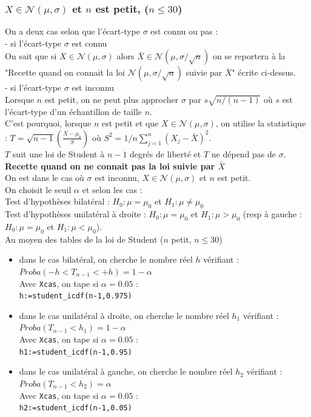 \documentclass[a4paper,11pt]{book}
\begin{document}
\subsubsection{$X \in \mathcal N(\mu,\sigma)$ et $n$ est petit,  ($n\leq30$)}
On a deux cas selon que l'\'ecart-type $\sigma$ est connu ou pas : \\
- si l'\'ecart-type $\sigma$ est connu\\
On sait que si $X \in \mathcal N(\mu,\sigma)$ alors 
$\bar X\in \mathcal N(\mu,\sigma/\sqrt n)$  on se reportera \`a la "Recette 
quand on connait la loi $\mathcal N(\mu,\sigma/\sqrt n)$ suivie par $\bar X$"
 \'ecrite ci-dessus.\\
- si l'\'ecart-type $\sigma$ est inconnu\\
Lorsque $n$ est petit, on ne peut plus approcher $\sigma$ par $s\sqrt{n/(n-1)}$
 o\`u $s$ est l'\'ecart-type  d'un \'echantillon de taille $n$.\\ 
C'est pourquoi, lorsque $n$ est petit et que $X \in \mathcal N(\mu,\sigma)$, on
utilise la statistique :
$T=\sqrt{n-1}(\frac{\bar X-\mu_0}{S})$ o\`u 
$S^2=1/n \sum_{j=1}^n(X_j-\bar X)^2$.\\
$T$ suit une loi de Student \`a $n-1$ degr\'es de libert\'e et $T$ ne d\'epend 
pas de $\sigma$. \\
{\bf Recette quand on ne connait pas la loi suivie par $\bar X$}\\ 
On est dans le cas o\`u 
$\sigma $ est inconnu, $X \in \mathcal N(\mu,\sigma)$ et $n$ est petit.\\
On choisit le seuil $\alpha$ et selon les cas :\\
Test d'hypoth\`eses bilat\'eral : $H_0 :\mu =\mu_0$ et  $H_1 : \mu\neq \mu_0$\\
Test d'hypoth\`eses unilat\'eral \`a droite : $H_0 :\mu =\mu_0$ et  
$H_1:\mu> \mu_0$ (resp \`a gauche : $H_0 :\mu =\mu_0$ et  $H_1:\mu< \mu_0$).\\
Au moyen des tables de la loi de
Student ($n$ petit, $n \leq 30$)  
\begin{itemize}
\item dans le cas bilat\'eral, on cherche le nombre r\'eel $h$ v\'erifiant : \\
$Proba(-h<T_{n-1}<+h)=1-\alpha$\\
Avec {\tt Xcas}, on tape  si $\alpha=0.05$ :\\
{\tt h:=student\_icdf(n-1,0.975)}
\item dans le cas unilat\'eral \`a droite, on cherche le nombre r\'eel $h_1$ 
v\'erifiant :\\
$Proba( T_{n-1}<h_1)=1-\alpha$\\
Avec {\tt Xcas}, on tape  si $\alpha=0.05$ :\\
{\tt h1:=student\_icdf(n-1,0.95)}
\item dans le cas unilat\'eral \`a gauche, on cherche le nombre r\'eel $h_2$ 
v\'erifiant :\\
$Proba(T_{n-1}<h_2)=\alpha$\\
Avec {\tt Xcas}, on tape  si $\alpha=0.05$ :\\
{\tt h2:=student\_icdf(n-1,0.05)}
\end{itemize}
\end{document}
